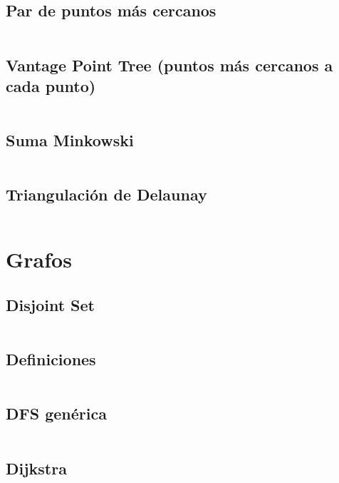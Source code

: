 \documentclass[11pt]{article}
\begin{document}
		\subsection{Par de puntos más cercanos}
		\inputminted[tabsize=2,breaklines,firstline=489,lastline=515,fontsize=\small]{c++}{geometry.cpp}
		
		\subsection{Vantage Point Tree (puntos más cercanos a cada punto)}
		\inputminted[tabsize=2,breaklines,firstline=517,lastline=580,fontsize=\small]{c++}{geometry.cpp}
		
		\subsection{Suma Minkowski}
		\inputminted[tabsize=2,breaklines,firstline=582,lastline=603,fontsize=\small]{c++}{geometry.cpp}
		
		\subsection{Triangulación de Delaunay}
		\inputminted[tabsize=2,breaklines,firstline=605,lastline=771,fontsize=\small]{c++}{geometry.cpp}
		
	\newpage
	\section{Grafos}
		\subsection{Disjoint Set}
		\inputminted[tabsize=2,breaklines,firstline=8,lastline=37,fontsize=\small]{c++}{graph.cpp}
		
		\subsection{Definiciones}
		\inputminted[tabsize=2,breaklines,firstline=39,lastline=100,fontsize=\small]{c++}{graph.cpp}
		
		\subsection{DFS genérica}
		\inputminted[tabsize=2,breaklines,firstline=411,lastline=429,fontsize=\small]{c++}{graph.cpp}
		
		\subsection{Dijkstra}
		\inputminted[tabsize=2,breaklines,firstline=102,lastline=125,fontsize=\small]{c++}{graph.cpp}
		
\end{document}

